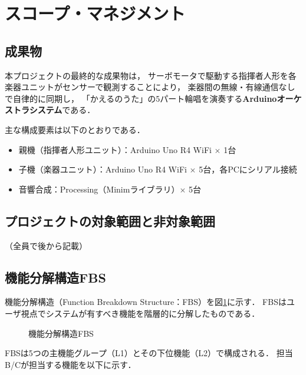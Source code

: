 \section{スコープ・マネジメント}

\subsection{成果物}

本プロジェクトの最終的な成果物は，
サーボモータで駆動する指揮者人形を各楽器ユニットがセンサーで観測することにより，
楽器間の無線・有線通信なしで自律的に同期し，
「かえるのうた」の5パート輪唱を演奏する\textbf{Arduinoオーケストラシステム}である．

主な構成要素は以下のとおりである．
\begin{itemize}
  \item 親機（指揮者人形ユニット）：Arduino Uno R4 WiFi $\times$ 1台
  \item 子機（楽器ユニット）：Arduino Uno R4 WiFi $\times$ 5台，各PCにシリアル接続
  \item 音響合成：Processing（Minimライブラリ）$\times$ 5台
\end{itemize}

\subsection{プロジェクトの対象範囲と非対象範囲}
（全員で後から記載）

\subsection{機能分解構造FBS}

機能分解構造（Function Breakdown Structure：FBS）を図\ref{fig:fbs}に示す．
FBSはユーザ視点でシステムが有すべき機能を階層的に分解したものである．

\begin{figure}[H]
  \centering
  \caption{機能分解構造FBS}
  \label{fig:fbs}
\end{figure}

FBSは5つの主機能グループ（L1）とその下位機能（L2）で構成される．
担当B/Cが担当する機能を以下に示す．

